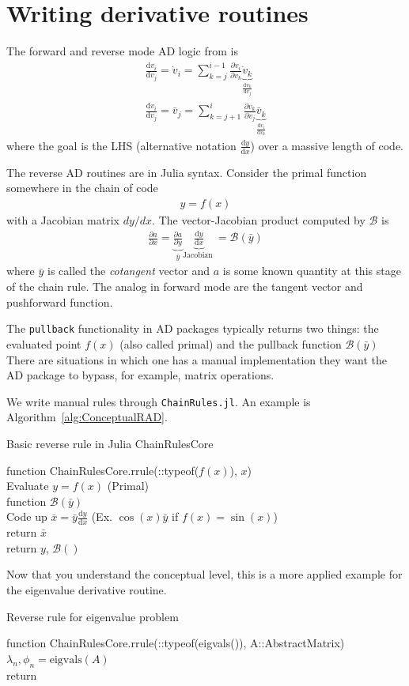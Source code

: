 \documentclass[10pt]{article}
\newcommand{\pp}[2]{\frac{\partial #1}{\partial #2}}
\newcommand{\dd}[2]{\frac{\textrm{d} #1}{\textrm{d} #2}}
\newcommand{\mcal}[1]{\mathcal{#1}} %
\newcommand{\ben}{\begin{eqnarray*}}
\newcommand{\een}{\end{eqnarray*}}
\newcommand{\tn}[1]{\textrm{#1}}
\begin{document}
\section{Writing derivative routines}
% 
The forward and reverse mode AD logic from \citet{Martins2022} is
\ben
\dd{v_i}{v_j} = \dot{v}_i = \sum_{k=j}^{i-1}\pp{v_i}{v_k} \underbrace{\dot{v}_k}_{\dd{v_k}{v_j}}
\\
\dd{v_i}{v_j} = \bar{v}_j = \sum_{k=j+1}^{i}{\pp{v_k}{v_j}} \underbrace{\bar{v}_k}_{\dd{v_i}{v_k}}
\een
where the goal is the LHS (alternative notation $\dd{y}{x}$) over a massive length of code.

The reverse AD routines are in Julia syntax.
Consider the primal function somewhere in the chain of code
\ben
y = f(x)
\een
with a Jacobian matrix $dy/dx$.
The vector-Jacobian product computed by $\mcal{B}$ is
\ben
\pp{a}{x} =
\underbrace{\pp{a}{y}}_{\bar{y}}
\underbrace{\dd{y}{x}}_{\tn{Jacobian }}
= \mcal{B}({\bar{y}})
\een
where $\bar{y}$ is called the \emph{cotangent} vector and $a$ is some known quantity at this stage of the chain rule.
The analog in forward mode are the tangent vector and pushforward function.

The \texttt{pullback} functionality in AD packages typically returns two things: the evaluated point $f(x)$ (also called primal) and the pullback function $\mcal{B}(\bar{y})$
There are situations in which one has a manual implementation they want the {AD} package to bypass, for example, matrix operations.

We write manual rules through \texttt{ChainRules.jl}.
An example is Algorithm~\ref{alg:ConceptualRAD}.
\begin{algorithm}[htb!]
    \caption{\label{alg:ConceptualRAD} Basic reverse rule in Julia ChainRulesCore}
    function ChainRulesCore.rrule(::typeof($f(x)$), $x$)\\
    \quad Evaluate $y = f(x)$ (Primal)\\
    \quad function $\mcal{B}(\bar{y})$\\
    \quad \quad Code up $\bar{x}= \bar{y} \dd{y}{x}$ (Ex. $\cos(x) \bar{y} $ if $f(x)=\sin(x)$)\\
    \quad return $\bar{x}$\\
    return $y$, $\mcal{B}()$
\end{algorithm}

Now that you understand the conceptual level, this is a more applied example for the eigenvalue derivative routine.
\begin{algorithm}[htb!]
    \caption{\label{alg:EigenRAD} Reverse rule for eigenvalue problem}
    function ChainRulesCore.rrule(::typeof(eigvals()), A::AbstractMatrix)\\
    \quad $\lambda_n, \phi_n = \tn{eigvals}(A)$ \\
    return
\end{algorithm}


\onecolumn
\appendix

\end{document}
